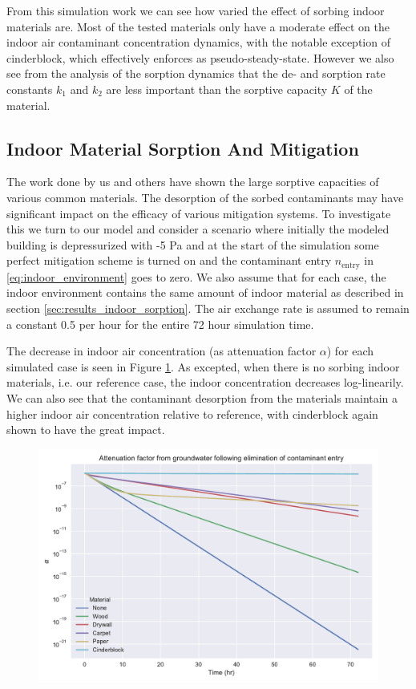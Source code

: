 From this simulation work we can see how varied the effect of sorbing indoor materials are.
Most of the tested materials only have a moderate effect on the indoor air contaminant concentration dynamics, with the notable exception of cinderblock, which effectively enforces as pseudo-steady-state.
However we also see from the analysis of the sorption dynamics that the de- and sorption rate constants $k_1$ and $k_2$ are less important than the sorptive capacity $K$ of the material.\par

\subsection{Indoor Material Sorption And Mitigation}\label{sec:results_indoor_mitigation}

The work done by us and others have shown the large sorptive capacities of various common materials.
The desorption of the sorbed contaminants may have significant impact on the efficacy of various mitigation systems.
To investigate this we turn to our model and consider a scenario where initially the modeled building is depressurized with -5 Pa and at the start of the simulation some perfect mitigation scheme is  turned on and the contaminant entry $n_\mathrm{entry}$ in \eqref{eq:indoor_environment} goes to zero.
We also assume that for each case, the indoor environment contains the same amount of indoor material as described in section \ref{sec:results_indoor_sorption}.
The air exchange rate is assumed to remain a constant 0.5 per hour for the entire 72 hour simulation time.\par %

The decrease in indoor air concentration (as attenuation factor $\alpha$) for each simulated case is seen in Figure \ref{fig:sorption_mitigation}.
As excepted, when there is no sorbing indoor materials, i.e. our reference case, the indoor concentration decreases log-linearily.
We can also see that the contaminant desorption from the materials maintain a higher indoor air concentration relative to reference, with cinderblock again shown to have the great impact.\par

\begin{figure}[!htb]
  \includegraphics[width=\textwidth]{sorption_mitigation.pdf}
  \caption{}
  \label{fig:sorption_mitigation}
\end{figure}
